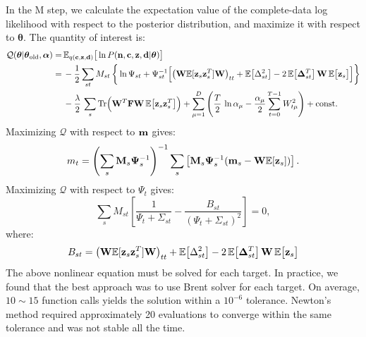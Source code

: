 \documentclass[nofootinbib,amssymb,amsmath]{revtex4}
\newcommand{\vd}{{\bf d}}
\newcommand{\vc}{{\bf c}}
\newcommand{\vz}{{\bf z}}
\newcommand{\vn}{{\bf n}}
\newcommand{\vm}{{\bf m}}
\newcommand{\vM}{{\bf M}}
\newcommand{\vW}{{\bf W}}
\newcommand{\vF}{{\bf F}}
\newcommand{\vPsi}{{\bf \Psi}}
\newcommand{\vDelta}{{\bf \Delta}}
\newcommand{\vtheta}{{\boldsymbol \theta}}
\newcommand{\valpha}{{\boldsymbol \alpha}}
\newcommand{\EE}{\mathbb{E}}
\begin{document}
In the M step, we calculate the expectation value of the complete-data log likelihood with respect to the posterior distribution, and maximize it with respect to $\vtheta$. The quantity of interest is:
%
\begin{align}
\mathcal{Q}(\vtheta|\vtheta_\mathrm{old}, \valpha) =&\, \EE_{q(\vc, \vz, \vd)}\big[\ln P(\vn, \vc, \vz, \vd | \vtheta)\big]\nonumber\\
=&\, - \frac{1}{2}\sum_{st} M_{st} \, \bigg\{\ln \Psi_{st} + \Psi_{st}^{-1}\Big[\big(\vW \EE[\vz_s \vz_s^T] \vW\big)_{tt} + \EE\big[\Delta_{st}^2\big] - 2 \, \EE\big[\vDelta_{st}^T\big] \, \vW \, \EE\big[\vz_s\big]\Big]\bigg\}\nonumber\\
&\,- \frac{\lambda}{2} \, \sum_s \mathrm{Tr}\Big(\vW^T \vF \vW \, \EE\big[\vz_s \vz_s^T\big]\Big) + \sum_{\mu=1}^{D}\left(\frac{T}{2} \, \ln \alpha_\mu -\frac{\alpha_\mu}{2} \sum_{t=0}^{T-1} W_{t\mu}^2  \right) + \mathrm{const.}
\label{eq:posterior_exp_log_likelihood}
\end{align}
%
Maximizing $\mathcal{Q}$ with respect to $\vm$ gives:
\begin{align}
m_t = \left(\sum_s \vM_s \vPsi_{s}^{-1} \right)^{-1} \sum_s \left[ \vM_s \vPsi_{s}^{-1}  (\vm_{s}  - \vW  \EE[\vz_{s}] ) \right].
\end{align}
Maximizing $\mathcal{Q}$ with respect to $\Psi_t$ gives:
\begin{equation}\label{eq:psi_stationarity}
\sum_s M_{st}\left[\frac{1}{\Psi_t + \Sigma_{st}} - \frac{B_{st}}{(\Psi_t + \Sigma_{st})^2} \right] = 0,
\end{equation}
where:
\begin{equation}
B_{st} = \big(\vW \EE[\vz_s \vz_s^T] \vW\big)_{tt} + \EE\big[\Delta_{st}^2\big] - 2 \, \EE\big[\vDelta_{st}^T\big] \, \vW \, \EE\big[\vz_s\big]
\end{equation}
The above nonlinear equation must be solved for each target. In practice, we found that the best approach was to use Brent solver for each target. On average, $10 \sim 15$ function calls yields the solution within a $10^{-6}$ tolerance. Newton's method required approximately 20 evaluations to converge within the same tolerance and was not stable all the time.\\
\end{document}
